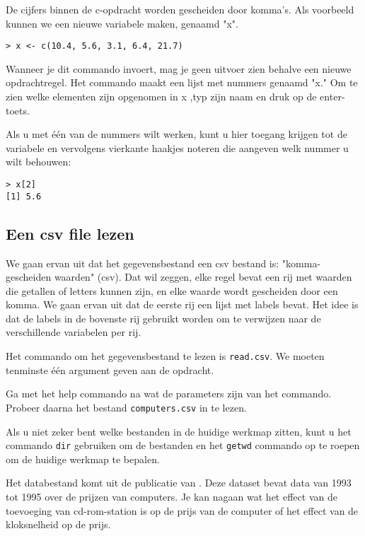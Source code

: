 De cijfers binnen de c-opdracht worden gescheiden door komma's. Als voorbeeld kunnen we een nieuwe variabele maken, genaamd "x".

\begin{lstlisting}
> x <- c(10.4, 5.6, 3.1, 6.4, 21.7)
\end{lstlisting}

Wanneer je dit commando invoert, mag je geen uitvoer zien behalve een nieuwe opdrachtregel. Het commando maakt een lijst met nummers genaamd "x." Om te zien welke elementen zijn opgenomen in x ,typ zijn naam en druk op de enter-toets.

Als u met één van de nummers wilt werken, kunt u hier toegang krijgen tot de variabele en vervolgens vierkante haakjes noteren die aangeven welk nummer u wilt behouwen:

\begin{lstlisting}
> x[2]
[1] 5.6
\end{lstlisting}

\subsection{Een csv file lezen}

We gaan ervan uit dat het gegevensbestand een csv bestand is: "komma-gescheiden waarden" (csv). Dat wil zeggen, elke regel bevat een rij met waarden die getallen of letters kunnen zijn, en elke waarde wordt gescheiden door een komma. We gaan ervan uit dat de eerste rij een lijst met labels bevat. Het idee is dat de labels in de bovenste rij gebruikt worden om te verwijzen naar de verschillende variabelen per rij.

Het commando om het gegevensbestand te lezen is \texttt{read.csv}. We moeten tenminste één argument geven aan de opdracht.

\begin{exercise}
  Ga met het help commando na wat de parameters zijn van het commando. Probeer daarna het bestand \texttt{computers.csv} in te lezen. 
\end{exercise}

Als u niet zeker bent welke bestanden in de huidige werkmap zitten, kunt u het commando \texttt{dir}  gebruiken om de bestanden en het  \texttt{getwd} commando op te roepen om de huidige werkmap te bepalen.

Het databestand komt uit de publicatie van \autocite{Stengos2005}. Deze dataset bevat data van 1993 tot 1995 over de prijzen van computers. Je kan nagaan wat het effect van de toevoeging van cd-rom-station is op de prijs van de computer of  het effect van de kloksnelheid op de prijs. 

